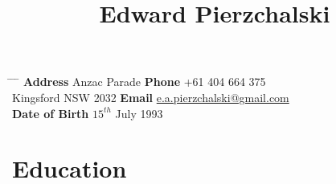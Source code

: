 \documentclass[10pt]{article} %
\begin{document}

\title{Edward Pierzchalski} %

\begin{tabbing}
 \hspace{0.2\textwidth} \= \hspace{0.3\textwidth} \= \hspace{0.2\textwidth} \= \kill
 {\bf Address}  Anzac Parade \> {\bf Phone} \> +61 404 664 375 \\
 \> Kingsford NSW 2032 \> {\bf Email} \> \href{mailto:e.a.pierzchalski@gmail.com}{e.a.pierzchalski@gmail.com} \\
 {\bf Date of Birth} \> $15^{th}$ July 1993 \\
\end{tabbing}



\section{Education}
\end{document}
